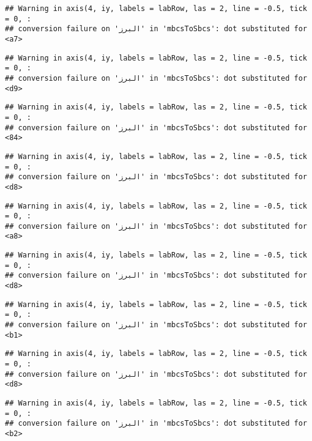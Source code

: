 \documentclass[
]{article}
\begin{document}
\begin{verbatim}
## Warning in axis(4, iy, labels = labRow, las = 2, line = -0.5, tick = 0, :
## conversion failure on 'البرز' in 'mbcsToSbcs': dot substituted for <a7>
\end{verbatim}

\begin{verbatim}
## Warning in axis(4, iy, labels = labRow, las = 2, line = -0.5, tick = 0, :
## conversion failure on 'البرز' in 'mbcsToSbcs': dot substituted for <d9>
\end{verbatim}

\begin{verbatim}
## Warning in axis(4, iy, labels = labRow, las = 2, line = -0.5, tick = 0, :
## conversion failure on 'البرز' in 'mbcsToSbcs': dot substituted for <84>
\end{verbatim}

\begin{verbatim}
## Warning in axis(4, iy, labels = labRow, las = 2, line = -0.5, tick = 0, :
## conversion failure on 'البرز' in 'mbcsToSbcs': dot substituted for <d8>
\end{verbatim}

\begin{verbatim}
## Warning in axis(4, iy, labels = labRow, las = 2, line = -0.5, tick = 0, :
## conversion failure on 'البرز' in 'mbcsToSbcs': dot substituted for <a8>
\end{verbatim}

\begin{verbatim}
## Warning in axis(4, iy, labels = labRow, las = 2, line = -0.5, tick = 0, :
## conversion failure on 'البرز' in 'mbcsToSbcs': dot substituted for <d8>
\end{verbatim}

\begin{verbatim}
## Warning in axis(4, iy, labels = labRow, las = 2, line = -0.5, tick = 0, :
## conversion failure on 'البرز' in 'mbcsToSbcs': dot substituted for <b1>
\end{verbatim}

\begin{verbatim}
## Warning in axis(4, iy, labels = labRow, las = 2, line = -0.5, tick = 0, :
## conversion failure on 'البرز' in 'mbcsToSbcs': dot substituted for <d8>
\end{verbatim}

\begin{verbatim}
## Warning in axis(4, iy, labels = labRow, las = 2, line = -0.5, tick = 0, :
## conversion failure on 'البرز' in 'mbcsToSbcs': dot substituted for <b2>
\end{verbatim}
\end{document}
